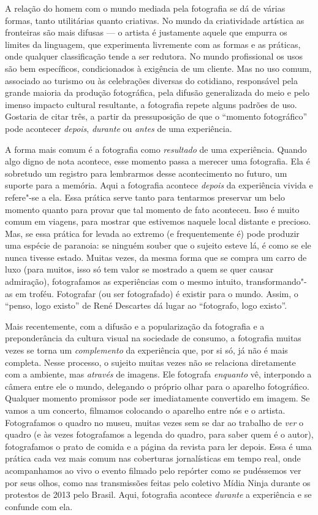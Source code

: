 A relação do homem com o mundo mediada pela fotografia se dá de várias
formas, tanto utilitárias quanto criativas. No mundo da criatividade
artística as fronteiras são mais difusas --- o artista é justamente aquele que empurra os limites da linguagem, que experimenta livremente com as formas e as práticas, onde qualquer classificação tende a ser redutora. No
mundo profissional os usos são bem específicos, condicionados à
exigência de um cliente. Mas no uso comum, associado ao turismo ou às
celebrações diversas do cotidiano, responsável pela grande maioria da
produção fotográfica, pela difusão generalizada do meio e pelo imenso
impacto cultural resultante, a fotografia repete alguns padrões de uso.
Gostaria de citar três, a partir da pressuposição de que o ``momento
fotográfico'' pode acontecer \emph{depois}, \emph{durante} ou
\emph{antes} de uma experiência.

A forma mais comum é a fotografia como \emph{resultado} de uma
experiência. Quando algo digno de nota acontece, esse momento passa a
merecer uma fotografia. Ela é sobretudo um registro para lembrarmos
desse acontecimento no futuro, um suporte para a memória. Aqui a
fotografia acontece \emph{depois} da experiência vivida e refere"-se a
ela. Essa prática serve tanto para tentarmos preservar um belo momento
quanto para provar que tal momento de fato aconteceu. Isso é muito comum
em viagens, para mostrar que estivemos naquele local distante e
precioso. Mas, se essa prática for levada ao extremo (e frequentemente
é) pode produzir uma espécie de paranoia: se ninguém souber que o
sujeito esteve lá, é como se ele nunca tivesse estado. Muitas vezes, da
mesma forma que se compra um carro de luxo (para muitos, isso só tem
valor se mostrado a quem se quer causar admiração), fotografamos as
experiências com o mesmo intuito, transformando"-as em troféu. Fotografar
(ou ser fotografado) é existir para o mundo. Assim, o ``penso, logo
existo'' de René Descartes dá lugar ao ``fotografo, logo existo''.

Mais recentemente, com a difusão e a popularização da fotografia e a
preponderância da cultura visual na sociedade de consumo, a fotografia
muitas vezes se torna um \emph{complemento} da experiência que, por si
só, já não é mais completa. Nesse processo, o sujeito muitas vezes não
se relaciona diretamente com a ambiente, mas \emph{através} de imagens.
Ele fotografa \emph{enquanto} vê, interpondo a câmera entre ele o mundo,
delegando o próprio olhar para o aparelho fotográfico. Qualquer momento
promissor pode ser imediatamente convertido em imagem. Se vamos a um
concerto, filmamos colocando o aparelho entre nós e o artista.
Fotografamos o quadro no museu, muitas vezes sem se dar ao trabalho de
\emph{ver} o quadro (e às vezes fotografamos a legenda do quadro, para
saber quem é o autor), fotografamos o prato de comida e a página da
revista para ler depois. Essa é uma prática cada vez mais comum nas
coberturas jornalísticas em tempo real, onde acompanhamos ao vivo o
evento filmado pelo repórter como se pudéssemos ver por seus olhos, como
nas transmissões feitas pelo coletivo Mídia Ninja durante os protestos
de 2013 pelo Brasil. Aqui, fotografia acontece \emph{durante} a
experiência e se confunde com ela.

